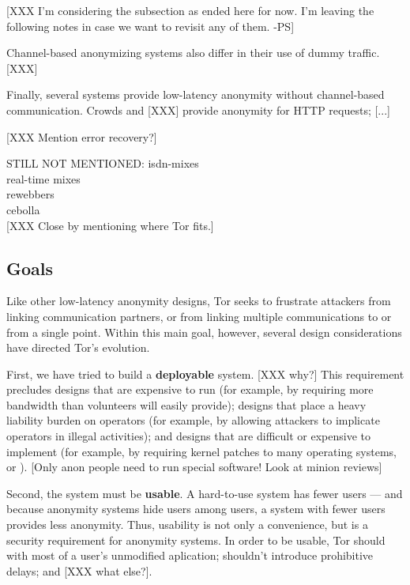 \documentclass[times,10pt,twocolumn]{article}
\begin{document}
[XXX I'm considering the subsection as ended here for now. I'm leaving the
following notes in case we want to revisit any of them. -PS]

Channel-based anonymizing systems also differ in their use of dummy traffic.
[XXX]

Finally, several systems provide low-latency anonymity without channel-based
communication.  Crowds and [XXX] provide anonymity for HTTP requests; [...]

[XXX Mention error recovery?]

STILL NOT MENTIONED:
isdn-mixes\\
real-time mixes\\
rewebbers\\
cebolla\\

[XXX Close by mentioning where Tor fits.]

\label{sec:assumptions}


\subsection{Goals}
Like other low-latency anonymity designs, Tor seeks to frustrate
attackers from linking communication partners, or from linking
multiple communications to or from a single point.  Within this
main goal, however, several design considerations have directed
Tor's evolution.

First, we have tried to build a {\bf deployable} system.  [XXX why?]
This requirement precludes designs that are expensive to run (for
example, by requiring more bandwidth than volunteers will easily
provide); designs that place a heavy liability burden on operators
(for example, by allowing attackers to implicate operators in illegal
activities); and designs that are difficult or expensive to implement
(for example, by requiring kernel patches to many operating systems,
or ).  [Only anon people need to run special software!  Look at minion
reviews]  

Second, the system must be {\bf usable}.  A hard-to-use system has
fewer users --- and because anonymity systems hide users among users, a
system with fewer users provides less anonymity.  Thus, usability is
not only a convenience, but is a security requirement for anonymity
systems.  In order to be usable, Tor should with most of a
user's unmodified aplication; shouldn't introduce prohibitive delays; and 
[XXX what else?].
\end{document}
